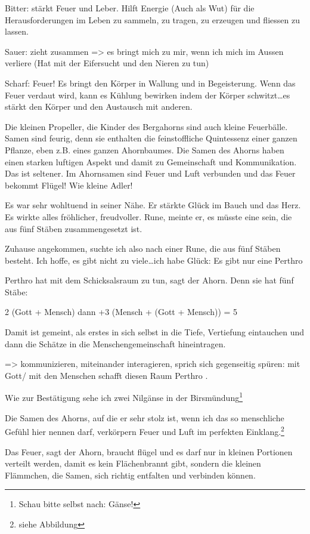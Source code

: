 \documentclass[11pt,titlepage,a5paper]{book}
\begin{document}
Bitter: stärkt Feuer und Leber. Hilft Energie (Auch als Wut) für die Herausforderungen im Leben zu sammeln, zu tragen, zu erzeugen und fliessen zu lassen.

Sauer: zieht zusammen => es bringt mich zu mir, wenn ich mich im Aussen verliere (Hat mit der Eifersucht und den Nieren zu tun)

Scharf: Feuer! Es bringt den Körper in Wallung und in Begeisterung. Wenn das Feuer verdaut wird, kann es Kühlung bewirken indem der Körper schwitzt\dots es stärkt den Körper und den Austausch mit anderen.

Die kleinen Propeller, die Kinder des Bergahorns sind auch kleine Feuerbälle. Samen sind feurig, denn sie enthalten die feinstoffliche Quintessenz einer ganzen Pflanze, eben z.B. eines ganzen Ahornbaumes. Die Samen des Ahorns haben einen starken luftigen Aspekt und damit zu Gemeinschaft und Kommunikation. Das ist seltener. Im Ahornsamen sind Feuer und Luft verbunden und das Feuer bekommt Flügel! Wie kleine Adler!

Es war sehr wohltuend in seiner Nähe. Er stärkte Glück im Bauch und das Herz. Es wirkte alles fröhlicher, freudvoller. 
Rune, meinte er, es müsste eine sein, die aus fünf Stäben zusammengesetzt ist.

Zuhause angekommen, suchte ich also nach einer Rune, die aus fünf Stäben besteht. Ich hoffe, es gibt nicht zu viele\dots ich habe Glück: Es gibt nur eine  Perthro 

Perthro  hat mit dem Schicksalsraum zu tun, sagt der Ahorn. Denn sie hat fünf Stäbe:

2 (Gott + Mensch) dann +3 (Mensch + (Gott + Mensch)) = 5

Damit ist gemeint, als erstes in sich selbst in die Tiefe, Vertiefung eintauchen und dann die Schätze in die Menschengemeinschaft hineintragen.

=> kommunizieren, miteinander interagieren, sprich sich gegenseitig spüren: mit Gott/ mit den Menschen schafft diesen Raum Perthro .

Wie zur Bestätigung sehe ich zwei Nilgänse in der Birsmündung\footnote{Schau bitte selbst nach: Gänse!}

Die Samen des Ahorns, auf die er sehr stolz ist, wenn ich das so menschliche Gefühl hier nennen darf, verkörpern Feuer und Luft im perfekten Einklang.\footnote{siehe Abbildung}

Das  Feuer, sagt der Ahorn, braucht flügel und es darf nur in kleinen Portionen verteilt werden, damit es kein Flächenbrannt gibt, sondern die kleinen Flämmchen, die Samen, sich richtig entfalten und verbinden können.
\end{document}
